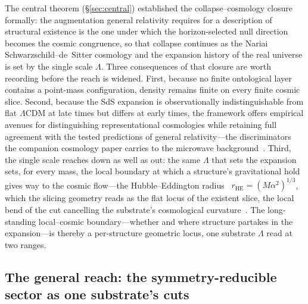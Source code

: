 \documentclass[11pt,a4paper]{article}
\theoremstyle{plain}
\theoremstyle{definition}
\theoremstyle{remark}
\begin{document}
The central theorem (\S\ref{sec:central}) established the collapse--cosmology closure formally: the augmentation general relativity requires for a description of structural existence is the one under which the horizon-selected null direction becomes the cosmic congruence, so that collapse continues as the Nariai Schwarzschild--de~Sitter cosmology and the expansion history of the real universe is set by the single scale $\Lambda$. Three consequences of that closure are worth recording before the reach is widened. First, because no finite ontological layer contains a point-mass configuration, density remains finite on every finite cosmic slice. Second, because the SdS expansion is observationally indistinguishable from flat $\Lambda$CDM at late times but differs at early times, the framework offers empirical avenues for distinguishing representational cosmologies while retaining full agreement with the tested predictions of general relativity---the discriminators the companion cosmology paper carries to the microwave background~\cite{JanzenCRcosmology}. Third, the single scale reaches down as well as out: the same $\Lambda$ that sets the expansion sets, for every mass, the local boundary at which a structure's gravitational hold gives way to the cosmic flow---the Hubble--Eddington radius~\cite{Eddington1933} $r_{\mathrm{HE}}=(M\alpha^{2})^{1/3}$, which the slicing geometry reads as the flat locus of the existent slice, the local bend of the cut cancelling the substrate's cosmological curvature~\cite{JanzenSlicing,JanzenOperator}. The long-standing local--cosmic boundary---whether and where structure partakes in the expansion---is thereby a per-structure geometric locus, one substrate $\Lambda$ read at two ranges.

\subsection{The general reach: the symmetry-reducible sector as one substrate's cuts}\label{sec:general-reach}
\end{document}
